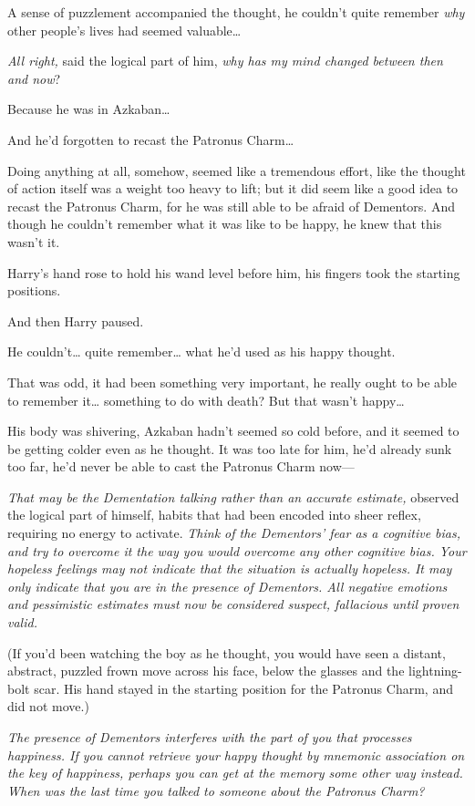 A sense of puzzlement accompanied the thought, he couldn't quite remember \emph{why} other people's lives had seemed valuable{\ldots}

\emph{All right,} said the logical part of him, \emph{why has my mind changed between then and now}?

Because he was in Azkaban{\ldots}

And he'd forgotten to recast the Patronus Charm{\ldots}

Doing anything at all, somehow, seemed like a tremendous effort, like the thought of action itself was a weight too heavy to lift; but it did seem like a good idea to recast the Patronus Charm, for he was still able to be afraid of Dementors. And though he couldn't remember what it was like to be happy, he knew that this wasn't it.

Harry's hand rose to hold his wand level before him, his fingers took the starting positions.

And then Harry paused.

He couldn't{\ldots} quite remember{\ldots} what he'd used as his happy thought.

That was odd, it had been something very important, he really ought to be able to remember it{\ldots} something to do with death? But that wasn't happy{\ldots}

His body was shivering, Azkaban hadn't seemed so cold before, and it seemed to be getting colder even as he thought. It was too late for him, he'd already sunk too far, he'd never be able to cast the Patronus Charm now—

\emph{That may be the Dementation talking rather than an accurate estimate,} observed the logical part of himself, habits that had been encoded into sheer reflex, requiring no energy to activate. \emph{Think of the Dementors' fear as a cognitive bias, and try to overcome it the way you would overcome any other cognitive bias. Your hopeless feelings may not indicate that the situation is actually hopeless. It may only indicate that you are in the presence of Dementors. All negative emotions and pessimistic estimates must now be considered suspect, fallacious until proven valid.}

(If you'd been watching the boy as he thought, you would have seen a distant, abstract, puzzled frown move across his face, below the glasses and the lightning-bolt scar. His hand stayed in the starting position for the Patronus Charm, and did not move.)

\emph{The presence of Dementors interferes with the part of you that processes happiness. If you cannot retrieve your happy thought by mnemonic association on the key of happiness, perhaps you can get at the memory some other way instead. When was the last time you talked to someone about the Patronus Charm?}

